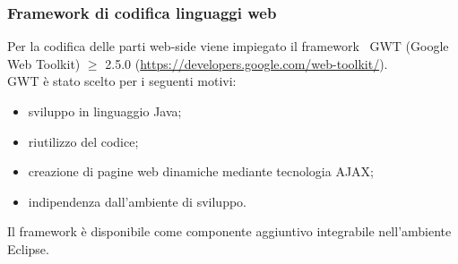 {{		\subsubsection{Framework di codifica linguaggi web}\label{FWgwt}{
			Per la codifica delle parti web-side viene impiegato il framework\g~ GWT (Google Web Toolkit) $\geqslant$ 2.5.0 (\url{https://developers.google.com/web-toolkit/}).\\
			GWT è stato scelto per i seguenti motivi:
			\begin{itemize}
				\item sviluppo in linguaggio Java;
				\item riutilizzo del codice;
				\item creazione di pagine web dinamiche mediante tecnologia AJAX\g ;
				\item indipendenza dall'ambiente di sviluppo.
			\end{itemize}
			Il framework è disponibile come componente aggiuntivo integrabile nell'ambiente Eclipse.
		}
	}
}